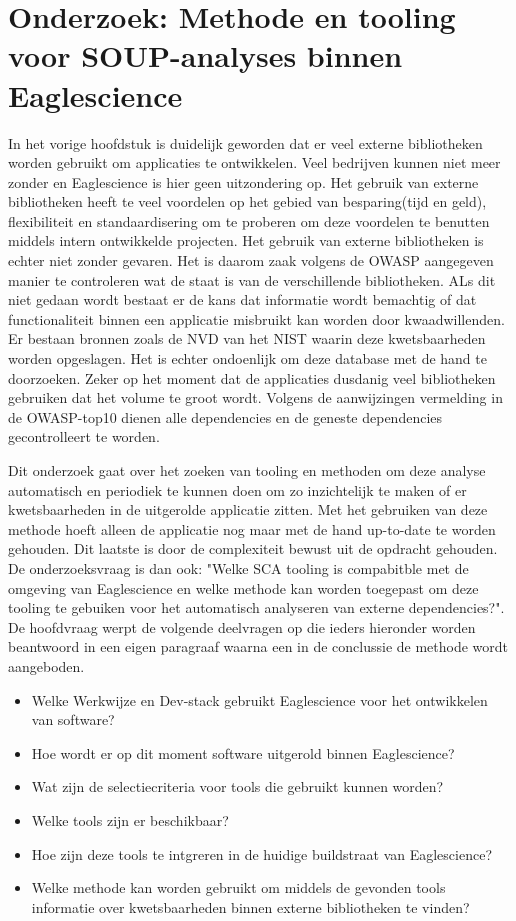 
\chapter{Onderzoek: Methode en tooling voor SOUP-analyses binnen Eaglescience}\label{ch:onderzoek-tool-methode}
In het vorige hoofdstuk is duidelijk geworden dat er veel externe bibliotheken worden gebruikt om applicaties te ontwikkelen. Veel bedrijven kunnen niet meer zonder en Eaglescience is hier geen uitzondering op. Het gebruik van externe bibliotheken heeft te veel voordelen op het gebied van besparing(tijd en geld), flexibiliteit en standaardisering om te proberen om deze voordelen te benutten middels intern ontwikkelde projecten. Het gebruik van externe bibliotheken is echter niet zonder gevaren. Het is daarom zaak volgens de OWASP aangegeven manier te controleren wat de staat is van de verschillende bibliotheken. ALs dit niet gedaan wordt bestaat er de kans dat informatie wordt bemachtig of dat functionaliteit binnen een applicatie misbruikt kan worden door kwaadwillenden. Er bestaan bronnen zoals de NVD van het NIST waarin deze kwetsbaarheden worden opgeslagen. Het is echter ondoenlijk om deze database met de hand te doorzoeken. Zeker op het moment dat de applicaties dusdanig veel bibliotheken gebruiken dat het volume te groot wordt. Volgens de aanwijzingen vermelding in de OWASP-top10 dienen alle dependencies en de geneste dependencies gecontrolleert te worden.

Dit onderzoek gaat over het zoeken van tooling en methoden om deze analyse automatisch en periodiek te kunnen doen om zo inzichtelijk te maken of er kwetsbaarheden in de uitgerolde applicatie zitten. Met het gebruiken van deze methode hoeft alleen de applicatie nog maar met de hand up-to-date te worden gehouden. Dit laatste is door de complexiteit bewust uit de opdracht gehouden. De onderzoeksvraag is dan ook: "Welke SCA tooling is compabitble met de omgeving van Eaglescience en welke methode kan worden toegepast om deze tooling te gebuiken voor het automatisch analyseren van externe dependencies?". De hoofdvraag werpt de volgende deelvragen op die ieders hieronder worden beantwoord in een eigen paragraaf waarna een in de conclussie de methode wordt aangeboden.
\begin{itemize}
    \item Welke Werkwijze en Dev-stack gebruikt Eaglescience voor het ontwikkelen van software?
    \item Hoe wordt er op dit moment software uitgerold binnen Eaglescience?
    \item Wat zijn de selectiecriteria voor tools die gebruikt kunnen worden?
    \item Welke tools zijn er beschikbaar?
    \item Hoe zijn deze tools te intgreren in de huidige buildstraat van Eaglescience?
    \item Welke methode kan worden gebruikt om middels de gevonden tools informatie over kwetsbaarheden binnen externe bibliotheken te vinden?
\end{itemize}


